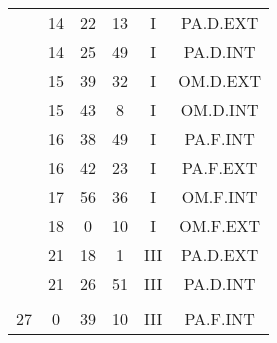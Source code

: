 \documentclass[12pt, a4paper]{article}
\begin{document}
\begin{multicols}{3}
{\begin{tabular}{c c c c c c}
	 	 	 	 & 14 & 22 & 13 & I & PA.D.EXT\\%
	 	 	 	 & 14 & 25 & 49 & I & PA.D.INT\\%
	 	 	 	 & 15 & 39 & 32 & I & OM.D.EXT\\%
	 	 	 	 & 15 & 43 & 8 & I & OM.D.INT\\%
	 	 	 	 & 16 & 38 & 49 & I & PA.F.INT\\%
	 	 	 	 & 16 & 42 & 23 & I & PA.F.EXT\\%
	 	 	 	 & 17 & 56 & 36 & I & OM.F.INT\\%
	 	 	 	 & 18 & 0 & 10 & I & OM.F.EXT\\%
	 	 	 	 & 21 & 18 & 1 & III & PA.D.EXT\\%
	 	 	 	 & 21 & 26 & 51 & III & PA.D.INT\\%
	 	 	 	 & & & & & \\%
	 	 	 	27 & 0 & 39 & 10 & III & PA.F.INT\\%
	 	 \end{tabular}
 	}
\end{multicols}
\end{document}
